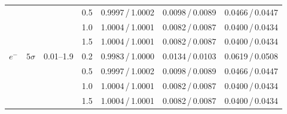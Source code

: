\begin{table}[H]
\begin{tabular}{@{}l l c c c c c@{}}
 &  &  & 0.5 & 0.9997\,/\,1.0002 & 0.0098\,/\,0.0089 & 0.0466\,/\,0.0447 \\
 &  &  & 1.0 & 1.0004\,/\,1.0001 & 0.0082\,/\,0.0087 & 0.0400\,/\,0.0434 \\
 &  &  & 1.5 & 1.0004\,/\,1.0001 & 0.0082\,/\,0.0087 & 0.0400\,/\,0.0434 \\
\midrule
$e^-$ & $5\sigma$ & 0.01--1.9 & 0.2 & 0.9983\,/\,1.0000 & 0.0134\,/\,0.0103 & 0.0619\,/\,0.0508 \\
 &  &  & 0.5 & 0.9997\,/\,1.0002 & 0.0098\,/\,0.0089 & 0.0466\,/\,0.0447 \\
 &  &  & 1.0 & 1.0004\,/\,1.0001 & 0.0082\,/\,0.0087 & 0.0400\,/\,0.0434 \\
 &  &  & 1.5 & 1.0004\,/\,1.0001 & 0.0082\,/\,0.0087 & 0.0400\,/\,0.0434 \\
\bottomrule
\end{tabular}
\end{table}
